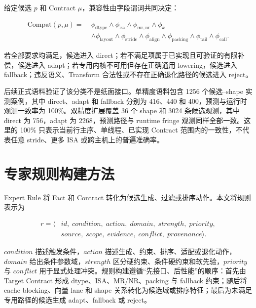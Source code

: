 给定候选 $p$ 和 Contract $\mu$，兼容性由字段谓词共同决定：

\begin{equation}
\begin{aligned}
\mathrm{Compat}(p,\mu)
=\;&
\phi_{\mathrm{dtype}}
\land\phi_{\mathrm{isa}}
\land\phi_{\mathrm{mr,nr}}
\land\phi_{k}\\
&\land\phi_{\mathrm{layout}}
\land\phi_{\mathrm{stride}}
\land\phi_{\mathrm{align}}
\land\phi_{\mathrm{packing}}
\land\phi_{\mathrm{tail}}
\land\phi_{\mathrm{call}}.
\end{aligned}
\label{eq:chapter3-contract-compatibility}
\end{equation}

若全部要求均满足，候选进入 direct；若不满足项属于已实现且可验证的有限补偿，候选进入 adapt；若专用内核不可用但存在正确通用 lowering，候选进入 fallback；违反语义、Transform 合法性或不存在正确退化路径的候选进入 reject。

后续正式语料验证了该分类不是纸面接口。单精度语料包含 1256 个候选--shape 实测案例，其中 direct、adapt 和 fallback 分别为 416、440 和 400，预测与运行时观测一致率为 100\%。双精度扩展覆盖 36 个 shape 和 3024 条候选观测，其中 direct 为 756，adapt 为 2268，预测路径与 runtime fringe 观测同样全部一致。这里的 100\% 只表示当前行主序、单线程、已实现 Contract 范围内的一致性，不代表任意 stride、更多 ISA 或跨主机上的普遍准确率。

\section{专家规则构建方法}

Expert Rule 将 Fact 和 Contract 转化为候选生成、过滤或排序动作。本文将规则表示为

\begin{equation}
\begin{aligned}
r=\langle&
id,\;condition,\;action,\;domain,\;strength,\;priority,\\
&source,\;scope,\;evidence,\;conflict,\;provenance
\rangle .
\end{aligned}
\label{eq:chapter3-rule-model}
\end{equation}

$condition$ 描述触发条件，$action$ 描述生成、约束、排序、适配或退化动作，$domain$ 给出条件参数域，$strength$ 区分硬约束、条件硬约束和软先验，$priority$ 与 $conflict$ 用于显式处理冲突。规则构建遵循“先接口、后性能”的顺序：首先由 Target Contract 形成 dtype、ISA、MR/NR、packing 与 fallback 约束；随后将 cache blocking、向量 lane 和 shape 关系转化为候选域或排序特征；最后为未满足专用路径的候选生成 adapt、fallback 或 reject。

